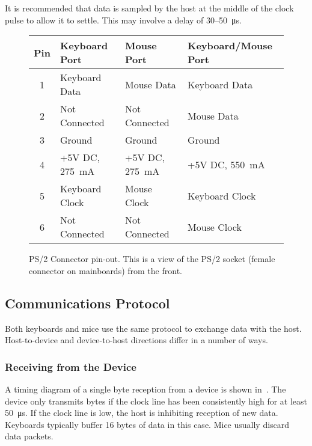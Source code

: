 It is recommended that data is sampled by the host at the middle of the clock
pulse to allow it to settle. This may involve a delay of 30–50~μs.

\begin{figure*}
  \centering
  \vspace{1em}\par

  \zebra
  \begin{tabular}{clll}
    Pin & Keyboard Port & Mouse Port & Keyboard/Mouse Port \\
    \hline
    1 & Keyboard Data & Mouse Data    & Keyboard Data \\
    2 & Not Connected & Not Connected & Mouse Data \\
    3 & Ground        & Ground        & Ground \\
    4 & +5V DC, 275~mA & +5V DC, 275~mA & +5V DC, 550~mA \\
    5 & Keyboard Clock & Mouse Clock    & Keyboard Clock \\
    6 & Not Connected & Not Connected & Mouse Clock \\
    \hline
  \end{tabular}
  \caption[PS/2 Connector Pin-Out]{\label{fig:kbd-ps2-pinout}PS/2 Connector
    pin-out. This is a view of the PS/2 socket (female connector on mainboards)
    from the front.}
\end{figure*}

\subsection{Communications Protocol}

Both keyboards and mice use the same protocol to exchange data with the
host. Host-to-device and device-to-host directions differ in a number of ways.

\subsubsection{Receiving from the Device}

A timing diagram of a single byte reception from a device is shown
in~. The device only transmits bytes if the clock line
has been consistently high for at least 50~μs. If the clock line is low, the
host is inhibiting reception of new data. Keyboards typically buffer 16 bytes
of data in this case. Mice usually discard data packets.

